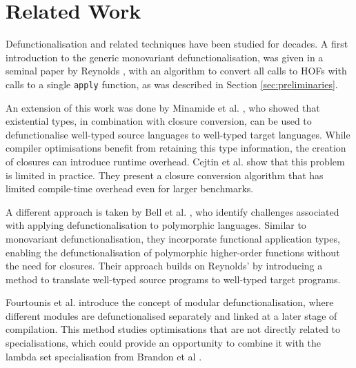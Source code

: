 \documentclass[a4paper,UKenglish,cleveref, autoref, thm-restate]{template/lipics-v2021}
\newcommand{\hofs}{HOFs\xspace}
\begin{document}

\section{Related Work}
Defunctionalisation and related techniques have been studied for decades. A first introduction to the generic monovariant defunctionalisation, was given in a seminal paper by Reynolds \cite{reynolds1972definitional}, with an algorithm to convert all calls to \hofs with calls to a single \texttt{apply} function, as was described in Section \ref{sec:preliminaries}.

An extension of this work was done by Minamide et al. \cite{minamide1996typed}, who showed that existential types, in combination with closure conversion, can be used to defunctionalise well-typed source languages to well-typed target languages. While compiler optimisations benefit from retaining this type information, the creation of closures can introduce runtime overhead. Cejtin et al. \cite{cejtin2000flow} show that this problem is limited in practice. They present a closure conversion algorithm that has limited compile-time overhead even for larger benchmarks.

A different approach is taken by Bell et al. \cite{bell1997type}, who identify challenges associated with applying defunctionalisation to polymorphic languages. Similar to monovariant defunctionalisation, they incorporate functional application types, enabling the defunctionalisation of polymorphic higher-order functions without the need for closures. Their approach builds on Reynolds' by introducing a method to translate well-typed source programs to well-typed target programs.

Fourtounis et al. \cite{fourtounis2014modular} introduce the concept of modular defunctionalisation, where different modules are defunctionalised separately and linked at a later stage of compilation. This method studies optimisations that are not directly related to specialisations, which could provide an opportunity to combine it with the lambda set specialisation from Brandon et al \cite{brandon2023better}.
\end{document}

